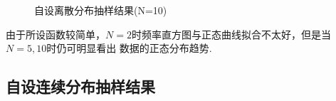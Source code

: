 \documentclass[12pt,a4paper,utf8]{ctexart}
\begin{document}
\begin{figure}[htb]
    \centering
    \hfill
    \hfill
    \hfill
    \caption{自设离散分布抽样结果(N=10)}
\end{figure}

由于所设函数较简单，$N=2$时频率直方图与正态曲线拟合不太好，但是当$N=5,10$时仍可明显看出
数据的正态分布趋势.

\subsection{自设连续分布抽样结果}
\end{document}
